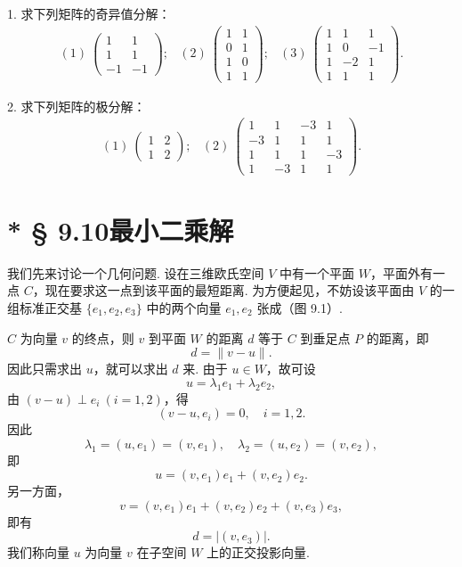 \documentclass[UTF8,12pt,a4paper,fontset=fandol]{ctexart}
\begin{document}
1. 求下列矩阵的奇异值分解：
\[
\begin{array}{lll}
(1)\ \left(\begin{array}{rr}1 & 1\\ 1 & 1\\ -1 & -1\end{array}\right);
&
(2)\ \left(\begin{array}{rr}1 & 1\\ 0 & 1\\ 1 & 0\\ 1 & 1\end{array}\right);
&
(3)\ \left(\begin{array}{rrr}1 & 1 & 1\\ 1 & 0 & -1\\ 1 & -2 & 1\\ 1 & 1 & 1\end{array}\right).
\end{array}
\]

2. 求下列矩阵的极分解：
\[
\begin{array}{ll}
(1)\ \left(\begin{array}{cc}1 & 2\\ 1 & 2\end{array}\right);
&
(2)\ \left(\begin{array}{rrrr}
1 & 1 & -3 & 1\\
-3 & 1 & 1 & 1\\
1 & 1 & 1 & -3\\
1 & -3 & 1 & 1
\end{array}\right).
\end{array}
\]

\section*{* § 9.10\quad 最小二乘解}

我们先来讨论一个几何问题. 设在三维欧氏空间 $V$ 中有一个平面 $W$，平面外有一点 $C$，现在要求这一点到该平面的最短距离. 为方便起见，不妨设该平面由 $V$ 的一组标准正交基 $\{e_1,e_2,e_3\}$ 中的两个向量 $e_1,e_2$ 张成（图 9.1）.

$C$ 为向量 $v$ 的终点，则 $v$ 到平面 $W$ 的距离 $d$ 等于 $C$ 到垂足点 $P$ 的距离，即
\[
  d=\|v-u\|.
\]
因此只需求出 $u$，就可以求出 $d$ 来. 由于 $u\in W$，故可设
\[
  u=\lambda_1e_1+\lambda_2e_2,
\]
由 $(v-u)\perp e_i\ (i=1,2)$，得
\[
  (v-u,e_i)=0,\quad i=1,2.
\]
因此
\[
  \lambda_1=(u,e_1)=(v,e_1),\quad \lambda_2=(u,e_2)=(v,e_2),
\]
即
\[
  u=(v,e_1)e_1+(v,e_2)e_2.
\]
另一方面，
\[
  v=(v,e_1)e_1+(v,e_2)e_2+(v,e_3)e_3,
\]
即有
\begin{equation}
  d=|(v,e_3)|.
  \tag{9.10.1}
\end{equation}
我们称向量 $u$ 为向量 $v$ 在子空间 $W$ 上的正交投影向量.
\end{document}
